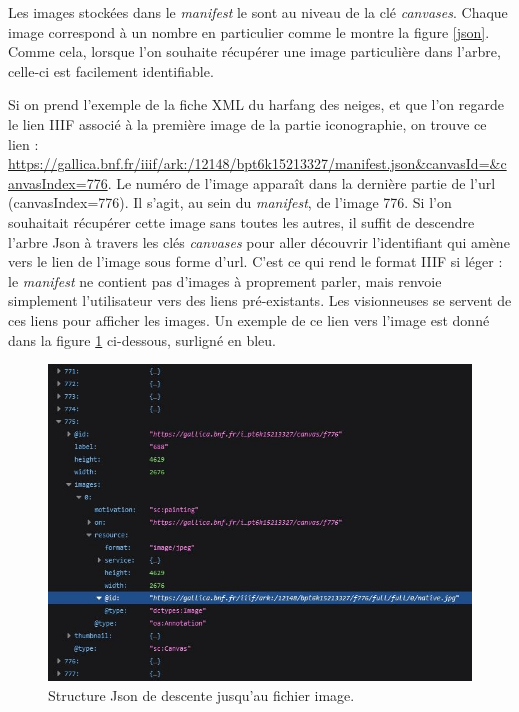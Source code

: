 \documentclass[a4paper,12pt,twoside]{book}
\begin{document}
Les images stockées dans le \textit{manifest} le sont au niveau de la clé \textit{canvases}. Chaque image correspond à un nombre en particulier comme le montre la figure \ref{json}. Comme cela, lorsque l'on souhaite récupérer une image particulière dans l'arbre, celle-ci est facilement identifiable.

Si on prend l'exemple de la fiche XML du harfang des neiges, et que l'on regarde le lien \acrshort{IIIF} associé à la première image de la partie iconographie, on trouve ce lien : \url{https://gallica.bnf.fr/iiif/ark:/12148/bpt6k15213327/manifest.json&canvasId=&canvasIndex=776}. Le numéro de l'image apparaît dans la dernière partie de l'url (canvasIndex=776). Il s'agit, au sein du \textit{manifest}, de l'image 776. Si l'on souhaitait récupérer cette image sans toutes les autres, il suffit de descendre l'arbre Json à travers les clés \textit{canvases} pour aller découvrir l'identifiant qui amène vers le lien de l'image sous forme d'url. C'est ce qui rend le format \acrshort{IIIF} si léger : le \textit{manifest} ne contient pas d'images à proprement parler, mais renvoie simplement l'utilisateur vers des liens pré-existants. Les visionneuses se servent de ces liens pour afficher les images. Un exemple de ce lien vers l'image est donné dans la figure \ref{harfang} ci-dessous, surligné en bleu.

\begin{figure}[H]
    \centering
    \includegraphics[width=13cm]{img/partie_3/harfang.JPG}
    \caption{Structure Json de descente jusqu'au fichier image.}
    \label{harfang}
\end{figure}
\end{document}
